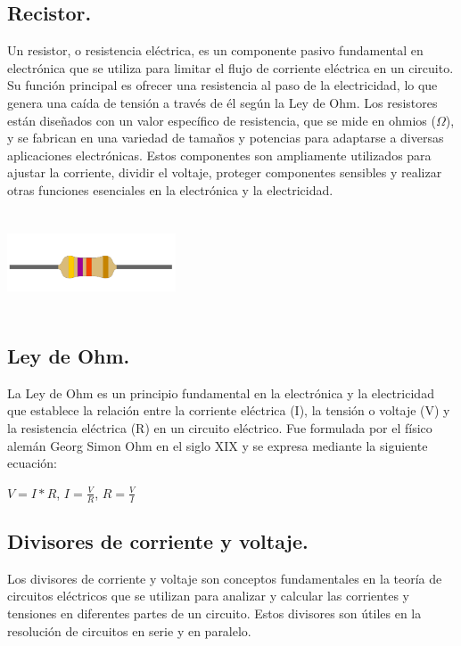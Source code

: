 \documentclass[10pt]{article}
\begin{document}
\begin{multicols}{2}
\subsection{Recistor.}
Un resistor, o resistencia eléctrica, es un componente pasivo fundamental en electrónica que se utiliza para limitar el flujo de corriente eléctrica en un circuito. Su función principal es ofrecer una resistencia al paso de la electricidad, lo que genera una caída de tensión a través de él según la Ley de Ohm. Los resistores están diseñados con un valor específico de resistencia, que se mide en ohmios ($\Omega$), y se fabrican en una variedad de tamaños y potencias para adaptarse a diversas aplicaciones electrónicas. Estos componentes son ampliamente utilizados para ajustar la corriente, dividir el voltaje, proteger componentes sensibles y realizar otras funciones esenciales en la electrónica y la electricidad.
\begin{center}
	\includegraphics[width=5cm, height=3cm]{Imagenes/resistor.png}
\end{center}
\subsection{Ley de Ohm.}
La Ley de Ohm es un principio fundamental en la electrónica y la electricidad que establece la relación entre la corriente eléctrica (I), la tensión o voltaje (V) y la resistencia eléctrica (R) en un circuito eléctrico. Fue formulada por el físico alemán Georg Simon Ohm en el siglo XIX y se expresa mediante la siguiente ecuación:
\begin{center}
	$ V=I*R$,  $I=\frac{V}{R}$, $R=\frac{V}{I}$
\end{center}


\subsection{Divisores de corriente y voltaje.}
Los divisores de corriente y voltaje son conceptos fundamentales en la teoría de circuitos eléctricos que se utilizan para analizar y calcular las corrientes y tensiones en diferentes partes de un circuito. Estos divisores son útiles en la resolución de circuitos en serie y en paralelo.

\end{multicols}
\end{document}
